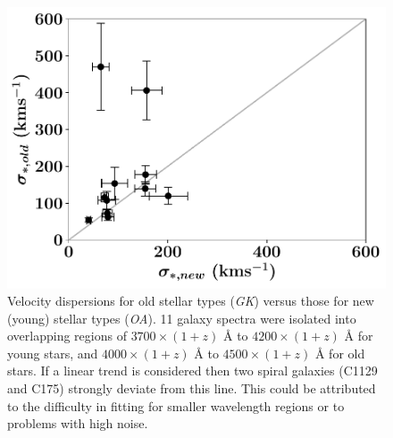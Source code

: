 \documentclass[12pt, twocolumn]{revtex4-1}    %
\begin{document}



\begin{figure}
\includegraphics[width=1.0\linewidth]{data/sigma_stars_old_vs_new}
\caption{Velocity dispersions for old stellar types (\textit{GK}) versus those for new (young) stellar types (\textit{OA}). 11 galaxy spectra were isolated into overlapping regions of $3700\times (1+z)$ {\AA} to $4200\times(1+z)$ {\AA} for young stars, and $4000\times (1+z)$ {\AA} to $4500\times(1+z)$ {\AA} for old stars. If a linear trend is considered then two spiral galaxies (C1129 and C175) strongly deviate from this line. This could be attributed to the difficulty in fitting for smaller wavelength regions or to problems with high noise. }
\label{fig:velocity_dispersions_old_new}
\end{figure} 


\vspace{2ex} %
\end{document}
